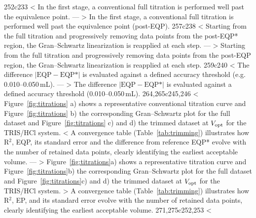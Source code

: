 252c233
< In the first stage, a conventional full titration is performed well past the equivalence point.
---
> In the first stage, a conventional full titration is performed well past the equivalence point (post-EQP).
257c238
< Starting from the full titration and progressively removing data points from the post-EQP* region, the Gran--Schwartz linearization is reapplied at each step.
---
> Starting from the full titration and progressively removing data points from the post-EQP region, the Gran--Schwartz linearization is reapplied at each step.
259c240
< The difference $|\text{EQP} - \text{EQP*}|$ is evaluated against a defined accuracy threshold (e.g. 0.010--0.050\,mL). 
---
> The difference $|\text{EQP} - \text{EQP*}|$ is evaluated against a defined accuracy threshold (0.010--0.050\,mL). 
264,265c245,246
< Figure~\ref{fig:titrations} a) shows a representative conventional titration curve and Figure~\ref{fig:titrations} b) the corresponding Gran--Schwartz plot for the full dataset and Figure~\ref{fig:titrations} c) and d) the trimmed dataset at $V_{\rm opt}$ for the TRIS/HCl system.
< A convergence table (Table~\ref{tab:trimming}) illustrates how R$^2$, EQP, its standard error and the difference from reference EQP* evolve with the number of retained data points, clearly identifying the earliest acceptable volume.
---
> Figure~\ref{fig:titrations}a) shows a representative titration curve and Figure~\ref{fig:titrations}b) the corresponding Gran--Schwartz plot for the full dataset and Figure~\ref{fig:titrations}c) and d) the trimmed dataset at $V_{\rm opt}$ for the TRIS/HCl system.
> A convergence table (Table~\ref{tab:trimming}) illustrates how R$^2$, EP, and its standard error evolve with the number of retained data points, clearly identifying the earliest acceptable volume.
271,275c252,253
<   \caption{Overview of the green analytical strategy for equivalence point (EQP) determination in potentiometric titrations, demonstrated for TRIS (0.1 M) titrated with  (0.1 M).
<   Left: a) Raw pH vs. titrant volume ($V$) curve from the initial titration (full run to post-EQP*). %
<   b) Schwartz--Gran modified plot ($V \times 10^{-\mathrm{pH}}$ vs. $V$), showing the straight pre-EQP* line extrapolated to the EQP* (dashed line; intercept at 5.005\,mL).
<   Right: c) Titration performed up to the optimal earliest acceptable point volume (4.40\,mL in this case).
<   d) Corresponding Schwartz--Green modified plot confirming EQP extrapolation (intercept at 5.002\,mL) with reduced dispensed titrant volume.}
